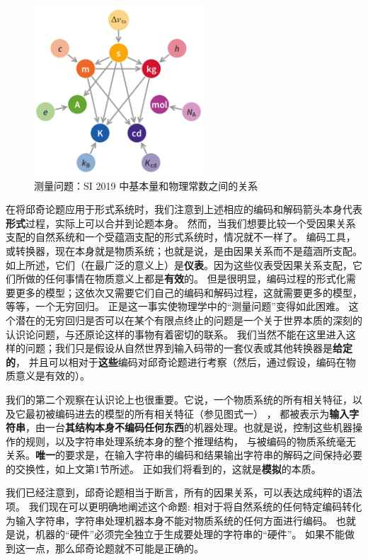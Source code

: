 \documentclass[a4paper,12pt]{article}
\begin{document}
\begin{figure}[ht]
\centering
\includegraphics[height=2.5in]{images/unit_relations_SI.png}
\caption{测量问题：SI 2019 中基本量和物理常数之间的关系}
\end{figure}

在将\gls{邱奇论题}应用于\gls{形式系统}时，我们注意到上述相应的\gls{编码}和\gls{解码}箭头本身代表\textbf{形式}过程，实际上可以合并到论题本身。
然而，当我们想要比较一个受\gls{因果关系}支配的自然系统和一个受\gls{蕴涵}支配的\gls{形式系统}时，情况就不一样了。
\gls{编码工具}，或\gls{转换器}，现在本身就是\gls{物质系统}；也就是说，是由\gls{因果关系}而不是\gls{蕴涵}所支配。
如上所述，它们（在最广泛的意义上）是\textbf{仪表}。因为这些仪表受\gls{因果关系}支配，它们所做的任何事情在\gls{物质}意义上都是\textbf{有效}的。
但是很明显，\gls{编码过程}的\gls{形式化}需要更多的\gls{模型}；这依次又需要它们自己的\gls{编码}和\gls{解码过程}，这就需要更多的\gls{模型}，等等，一个无穷回归。
正是这一事实使物理学中的“\gls{测量问题}”变得如此困难。
这个潜在的无穷回归是否可以在某个有限点终止的问题是一个关于世界本质的深刻的认识论问题，与还原论这样的事物有着密切的联系。
我们当然不能在这里进入这样的问题；我们只是假设从自然世界到输入码带的一套仪表或其他\gls{转换器}是\textbf{给定的}，
并且可以相对于\textbf{这些}\gls{编码}对\gls{邱奇论题}进行考察（然后，通过假设，\gls{编码}在\gls{物质}意义是有效的）。

我们的第二个观察在认识论上也很重要。它说，一个\gls{物质系统}的所有相关特征，以及它最初被\gls{编码}进去的\gls{模型}的所有相关特征（参见图式一） ，
都被表示为\textbf{输入字符串}，由一台\textbf{其结构本身不\gls{编码}任何东西}的机器处理。也就是说，控制这些机器操作的规则，以及\gls{字符串处理}系统本身的整个\gls{推理结构}，
与被\gls{编码}的\gls{物质系统}毫无关系。\textbf{唯一}的要求是，在输入字符串的\gls{编码}和结果输出字符串的\gls{解码}之间保持必要的交换性，如上文第1节所述。
正如我们将看到的，这就是\textbf{\gls{模拟}}的本质。

我们已经注意到，\gls{邱奇论题}相当于断言，所有的\gls{因果关系}，可以表达成纯粹的\gls{语法项}。
我们现在可以更明确地阐述这个命题: 相对于将自然系统的任何特定\gls{编码}转化为输入字符串，\gls{字符串处理}机器本身不能对\gls{物质系统}的任何方面进行\gls{编码}。
也就是说，机器的“\gls{硬件}”必须完全独立于\gls{生成}要处理的字符串的“\gls{硬件}”。 如果不能做到这一点，那么\gls{邱奇论题}就不可能是正确的。
\end{document}
